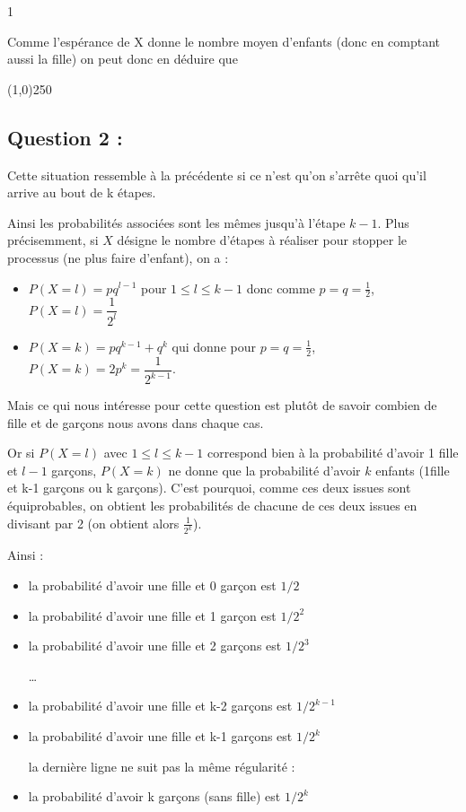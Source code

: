 1\documentclass[a4paper, 11pt,french]{article}
\begin{document}
Comme l'espérance de X donne le nombre moyen d'enfants (donc en comptant aussi la fille) on peut donc en déduire que 

\bigskip

\begin{center}
\line(1,0){250}
\end{center}

\bigskip

\subsection*{Question 2 : }

Cette situation ressemble à la précédente si ce n'est qu'on s'arrête quoi qu'il arrive au bout de k étapes.


Ainsi les probabilités associées sont les mêmes jusqu'à l'étape $k-1$. Plus précisemment, si $X$ désigne le nombre d'étapes à réaliser pour stopper le processus (ne plus faire d'enfant), on a :

\begin{itemize}
\item $P(X=l)=pq^{l-1}$ pour $1\leqslant l \leqslant k-1$ donc comme $p=q=\frac{1}{2}$, $P(X=l)=\dfrac{1}{2^{l}}$
\item $P(X=k)=pq^{k-1}+q^k$ qui donne pour $p=q=\frac{1}{2}$, $P(X=k)=2p^k=\dfrac{1}{2^{k-1}}$.
\end{itemize}

Mais ce qui nous intéresse pour cette question est plutôt de savoir combien de fille et de garçons nous avons dans chaque cas.

Or si $P(X=l)$ avec $1\leqslant l\leqslant k-1$ correspond bien à la probabilité d'avoir 1 fille et $l-1$ garçons, $P(X=k)$ ne donne que la probabilité d'avoir $k$ enfants (1fille et k-1 garçons ou k garçons). C'est pourquoi, comme ces deux issues sont équiprobables, on obtient les probabilités de chacune de ces deux issues en divisant par 2 (on obtient alors $\frac{1}{2^k}$).

Ainsi :  

\begin{itemize}
\item la probabilité d'avoir une fille et 0 garçon est $1/2$
\item la probabilité d'avoir une fille et 1 garçon est $1/2^2$
\item la probabilité d'avoir une fille et 2 garçons est $1/2^3$

  \ldots

\item la probabilité d'avoir une fille et k-2 garçons est $1/2^{k-1}$
\item la probabilité d'avoir une fille et k-1 garçons est $1/2^{k}$

  la dernière ligne ne suit pas la même régularité :
  
\item la probabilité d'avoir k garçons (sans fille) est $1/2^{k}$
\end{itemize}
\end{document}
